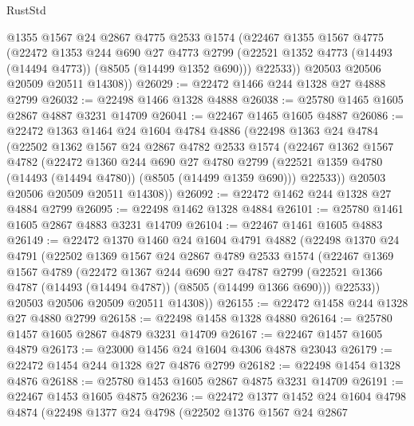 \begin{lexlean}{RustStd}
\begin{coremodule}
        @1355
        @1567
        @24
        @2867
        @4775
        @2533
        @1574
        (@22467
          @1355
          @1567
          @4775
          (@22472
            @1353
            @244
            @690
            @27
            @4773
            @2799
            (@22521 @1352 @4773 (@14493 (@14494 @4773)) (@8505 (@14499 @1352 @690)))
            @22533))
        @20503
        @20506
        @20509
        @20511
        @14308))
@26029 := @22472 @1466 @244 @1328 @27 @4888 @2799
@26032 := @22498 @1466 @1328 @4888
@26038 := @25780 @1465 @1605 @2867 @4887 @3231 @14709
@26041 := @22467 @1465 @1605 @4887
@26086 := @22472
    @1363
    @1464
    @24
    @1604
    @4784
    @4886
    (@22498
      @1363
      @24
      @4784
      (@22502
        @1362
        @1567
        @24
        @2867
        @4782
        @2533
        @1574
        (@22467
          @1362
          @1567
          @4782
          (@22472
            @1360
            @244
            @690
            @27
            @4780
            @2799
            (@22521 @1359 @4780 (@14493 (@14494 @4780)) (@8505 (@14499 @1359 @690)))
            @22533))
        @20503
        @20506
        @20509
        @20511
        @14308))
@26092 := @22472 @1462 @244 @1328 @27 @4884 @2799
@26095 := @22498 @1462 @1328 @4884
@26101 := @25780 @1461 @1605 @2867 @4883 @3231 @14709
@26104 := @22467 @1461 @1605 @4883
@26149 := @22472
    @1370
    @1460
    @24
    @1604
    @4791
    @4882
    (@22498
      @1370
      @24
      @4791
      (@22502
        @1369
        @1567
        @24
        @2867
        @4789
        @2533
        @1574
        (@22467
          @1369
          @1567
          @4789
          (@22472
            @1367
            @244
            @690
            @27
            @4787
            @2799
            (@22521 @1366 @4787 (@14493 (@14494 @4787)) (@8505 (@14499 @1366 @690)))
            @22533))
        @20503
        @20506
        @20509
        @20511
        @14308))
@26155 := @22472 @1458 @244 @1328 @27 @4880 @2799
@26158 := @22498 @1458 @1328 @4880
@26164 := @25780 @1457 @1605 @2867 @4879 @3231 @14709
@26167 := @22467 @1457 @1605 @4879
@26173 := @23000 @1456 @24 @1604 @4306 @4878 @23043
@26179 := @22472 @1454 @244 @1328 @27 @4876 @2799
@26182 := @22498 @1454 @1328 @4876
@26188 := @25780 @1453 @1605 @2867 @4875 @3231 @14709
@26191 := @22467 @1453 @1605 @4875
@26236 := @22472
    @1377
    @1452
    @24
    @1604
    @4798
    @4874
    (@22498
      @1377
      @24
      @4798
      (@22502
        @1376
        @1567
        @24
        @2867

\end{coremodule}
\end{lexlean}
